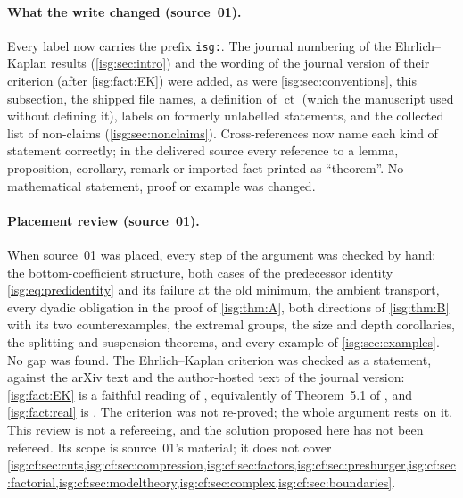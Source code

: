 \documentclass[11pt]{article}
\theoremstyle{definition}
\theoremstyle{remark}
\newcommand{\ct}{\operatorname{ct}}
\begin{document}
\paragraph{What the write changed (source~01).} Every label now carries the prefix
\texttt{isg:}. The journal numbering of the Ehrlich--Kaplan results
(\cref{isg:sec:intro}) and the wording of the journal version of their
criterion (after \cref{isg:fact:EK}) were added, as were
\cref{isg:sec:conventions}, this subsection, the shipped file names, a
definition of $\ct$ (which the manuscript used without defining it),
labels on formerly unlabelled statements, and the collected list of
non-claims (\cref{isg:sec:nonclaims}). Cross-references now name each kind
of statement correctly; in the delivered source every reference to a
lemma, proposition, corollary, remark or imported fact printed as
``theorem''. No mathematical statement, proof or example was changed.

\paragraph{Placement review (source~01).} When source~01 was placed, every step
of the argument was checked by hand: the bottom-coefficient structure,
both cases of the predecessor identity \eqref{isg:eq:predidentity} and its
failure at the old minimum, the ambient transport, every dyadic obligation
in the proof of \cref{isg:thm:A}, both directions of \cref{isg:thm:B}
with its two counterexamples, the extremal groups, the size and depth
corollaries, the splitting and suspension theorems, and every example of
\cref{isg:sec:examples}. No gap was found. The Ehrlich--Kaplan criterion
was checked as a statement, against the arXiv text and the author-hosted
text of the journal version: \cref{isg:fact:EK} is a faithful reading of
\cite[Theorem~1 and its proof]{EK}, equivalently of Theorem~5.1 of
\cite{EKjournal}, and \cref{isg:fact:real} is \cite[Lemma~3]{EK}. The
criterion was not re-proved; the whole argument rests on it. This review
is not a refereeing, and the solution proposed here has not been refereed.
Its scope is source~01's material; it does not cover
\cref{isg:cf:sec:cuts,isg:cf:sec:compression,isg:cf:sec:factors,isg:cf:sec:presburger,isg:cf:sec:factorial,isg:cf:sec:modeltheory,isg:cf:sec:complex,isg:cf:sec:boundaries}.
\end{document}
